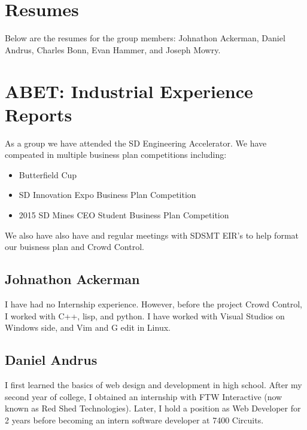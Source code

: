 

\section{Resumes}

Below are the resumes for the group members: Johnathon Ackerman, Daniel Andrus, Charles Bonn, Evan Hammer, and Joseph Mowry.


%     
%     
%     






\section{ABET:  Industrial Experience Reports}
As a group we have attended the  SD Engineering Accelerator. We have compeated in multiple business plan competitions including:
	\begin{itemize}
	\item{Butterfield Cup}
	\item{SD Innovation Expo Business Plan Competition}
	\item{2015 SD Mines CEO Student Business Plan Competition}
	\end{itemize}
We also have also have and regular meetings with SDSMT EIR's to help format our buisness plan and Crowd Control.

\subsection{Johnathon Ackerman}

 I have had no Internship experience. However, before the project Crowd Control, I worked with C++, lisp, and python. I have worked with Visual Studios on Windows side, and Vim and G edit in Linux. 

\subsection{Daniel Andrus}

I first learned the basics of web design and development in high school. After my second year of college, I obtained an internship with FTW Interactive (now known as Red Shed Technologies). Later, I hold a position as Web Developer for 2 years before becoming an intern software developer at 7400 Circuits.

